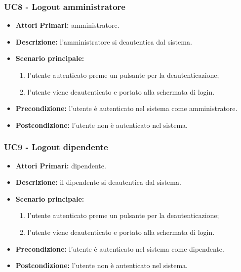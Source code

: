 \subsubsection{ UC8 - Logout amministratore}
\begin{itemize}
	\item\textbf{Attori Primari:} 
	amministratore.
	\item\textbf{Descrizione:} 
	l'amministratore si deautentica dal sistema.
	\item\textbf{Scenario principale:} 
	\begin{enumerate}
		\item l'utente autenticato preme un pulsante per la deautenticazione;
		\item l'utente viene deautenticato e portato alla schermata di login.
	\end{enumerate}
	\item\textbf{Precondizione:} 
	l'utente è autenticato nel sistema come amministratore.
	\item\textbf{Postcondizione:}
	l'utente non è autenticato nel sistema.
\end{itemize}

\subsubsection{ UC9 - Logout dipendente}
\begin{itemize}
	\item\textbf{Attori Primari:} 
	dipendente.
	\item\textbf{Descrizione:} 
	il dipendente si deautentica dal sistema.
	\item\textbf{Scenario principale:} 
	\begin{enumerate}
		\item l'utente autenticato preme un pulsante per la deautenticazione;
		\item l'utente viene deautenticato e portato alla schermata di login.
	\end{enumerate}
	\item\textbf{Precondizione:} 
	l'utente è autenticato nel sistema come dipendente.
	\item\textbf{Postcondizione:}
	l'utente non è autenticato nel sistema.
\end{itemize}


